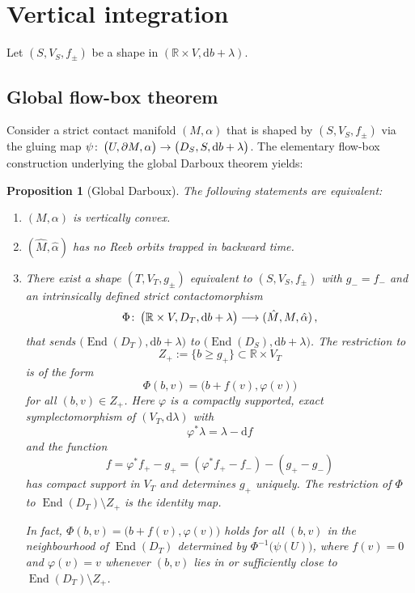 \documentclass{amsart}
\newtheorem{prop}{Proposition}[subsection]
\theoremstyle{definition}
\def\co{\colon\thinspace}
\newcommand{\rmd}{\mathrm d}
\newcommand{\R}{\mathbb R}
\newcommand{\lra}{\longrightarrow}
\newcommand{\ra}{\rightarrow}
\DeclareMathOperator{\End}{\mathrm{End}}
\begin{document}


\section{Vertical integration}
\label{sec:vertint}

Let $(S,V_S,f_{\pm})$ be a shape in $(\R\times V,\rmd b+\lambda)$.



\subsection{Global flow-box theorem\label{subsec:globalflowbox}}
Consider a strict contact manifold $(M,\alpha)$
that is shaped by $(S,V_S,f_{\pm})$ via the gluing map
	$
	  \psi\co
	  \big(U,\partial M,\alpha\big)
	  \ra
	  \big(D_S,S,\rmd b+\lambda\big)
	$.
The elementary flow-box construction underlying
the global Darboux theorem \cite[Theorem~2]{eh94} yields:


\begin{prop}[Global Darboux]
 \label{prop:globalflowbox}
 The following statements are equivalent:
	\begin{enumerate}
	  \item[(a)]
	  $(M,\alpha)$ is vertically convex.
	  \item[(b)]
	  $(\hat{M},\hat{\alpha})$ has no Reeb orbits
	  trapped in backward time.
	  \item[(c)]
	  There exist a shape $(T,V_T,g_{\pm})$
	  equivalent to $(S,V_S,f_{\pm})$ with $g_-=f_-$
	  and an intrinsically defined strict contactomorphism
	  \[
	    \Phi\co
	    \big(\R\times V,D_T,\rmd b+\lambda\big)
	    \lra
	    (\hat{M},M,\hat{\alpha})
	    \,,
	  \]
	  that sends $\big(\!\End(D_T),\rmd b+\lambda\big)$
	  to $\big(\!\End(D_S),\rmd b+\lambda\big)$.
	  The restriction to
	  \[
	    Z_+:=\{b\geq g_+\}\subset\R\times V_T
	  \]
	  is of the form
	  \[
	    \Phi(b,v)=\big(b+f(v),\varphi(v)\big)
	  \]
	  for all $(b,v)\in Z_+$.
	  Here $\varphi$ is a compactly supported,
	  exact symplectomorphism of $(V_T,\rmd\lambda)$
	  with
	  \[
	  \varphi^*\lambda=\lambda-\rmd f
	  \]
	  and the function
	  \[
	  f=\varphi^*f_+-g_+
	  =(\varphi^*f_+-f_-)-(g_+-g_-)
	  \]
	  has compact support in $V_T$ and determines $g_+$
	  uniquely.
	  The restriction of $\Phi$ to $\End(D_T)\setminus Z_+$
	  is the identity map.
	  
	  In fact,
	  $\Phi(b,v)=\big(b+f(v),\varphi(v)\big)$
	  holds for all $(b,v)$ in the neighbourhood of $\End(D_T)$
	  determined by $\Phi^{-1}\big(\psi(U)\big)$,
	  where $f(v)=0$ and $\varphi(v)=v$
	  whenever $(b,v)$ lies
	  in or sufficiently close to $\End(D_T)\setminus Z_+$.
	\end{enumerate}
\end{prop}
\end{document}
